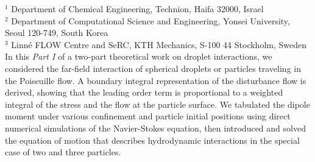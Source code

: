 %
%
%
%
%
%
%
\paperaffiliation
{%
  $^1$ Department of Chemical Engineering, Technion, Haifa 32000, Israel\\%
  $^2$ Department of Computational Science and Engineering, Yonsei University, \\Seoul 120-749, South Korea\\%
  $^3$ Linn\'e FLOW Centre and SeRC, KTH Mechanics, S-100 44 Stockholm, Sweden%
}%
%
%
%
%
%
%
\paperpages{}%
%
%
%
\papersummary%
{%
   In this \emph{Part I} of a two-part theoretical work on droplet interactions, we considered the far-field interaction of spherical droplets or particles traveling in the Poiseuille flow. A boundary integral representation of the disturbance flow is derived, showing that the leading order term is proportional to a weighted integral of the stress and the flow at the particle surface. We tabulated the dipole moment under various confinement and particle initial positions using direct numerical simulations of the Navier-Stokes equation, then introduced and solved the equation of motion that describes hydrodynamic interactions in the special case of two and three particles. 
}%
%
\graphicspath{{paper3/}}%
%
%
%
